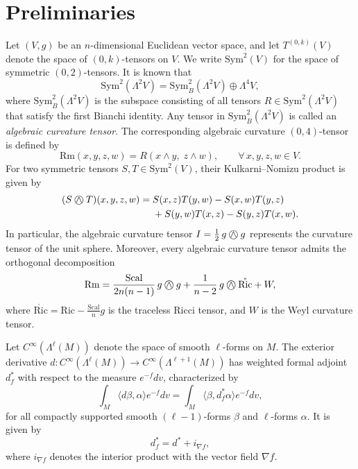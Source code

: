 \documentclass[leqno,12pt]{article} %
\theoremstyle{plain} %
\theoremstyle{definition} %
\numberwithin{equation}{section}
\newcommand{\KN}{\mathbin{\bigcirc\mspace{-15mu}\wedge\mspace{3mu}}}
\begin{document}
\section{Preliminaries}\label{sec2}
Let $(V,g)$ be an $n$-dimensional Euclidean vector space, and let
$T^{(0,k)}(V)$ denote the space of $(0,k)$-tensors on $V$. We write
$\mathrm{Sym}^2(V)$ for the space of symmetric $(0,2)$-tensors. It is known that
\[
\mathrm{Sym}^2(\Lambda^2V)
=
\mathrm{Sym}_B^2(\Lambda^2V)
\oplus
\Lambda^4V,
\]
where $\mathrm{Sym}_B^2(\Lambda^2V)$ is the subspace consisting of all tensors
$R\in\mathrm{Sym}^2(\Lambda^2V)$ that satisfy the first Bianchi identity.
Any tensor in $\mathrm{Sym}_B^2(\Lambda^2V)$ is called an
\emph{algebraic curvature tensor}.
The corresponding algebraic curvature $(0,4)$-tensor is defined by
\[
\mathrm{Rm}(x,y,z,w)
=
R(x\wedge y,\; z\wedge w),
\qquad
\forall\, x,y,z,w\in V.
\]
For two symmetric tensors $S,T\in\mathrm{Sym}^2(V)$, their
Kulkarni--Nomizu product is given by
\[
\begin{aligned}
(S\KN T)(x,y,z,w)
={}&
S(x,z)T(y,w)-S(x,w)T(y,z) \\
&
+S(y,w)T(x,z)-S(y,z)T(x,w).
\end{aligned}
\]
In particular, the algebraic curvature tensor $I=\frac12\,g\KN g$
represents the curvature tensor of the unit sphere.
Moreover, every algebraic curvature tensor admits the orthogonal decomposition
\[
\mathrm{Rm} = \frac{\mathrm{Scal}}{2n(n-1)}\,g\KN g +
\frac{1}{n-2}\,g\KN\mathring{\mathrm{Ric}} + W,
\]
where
$\mathring{\mathrm{Ric}} =\mathrm{Ric} - \frac{\mathrm{Scal}}{n}g$
is the traceless Ricci tensor, and $W$ is the Weyl curvature tensor.



Let $C^\infty(\Lambda^\ell(M))$ denote the
space of smooth $\ell$-forms on $M$. The exterior derivative
$d:C^\infty(\Lambda^\ell(M))
\longrightarrow
C^\infty(\Lambda^{\ell+1}(M))$
has weighted formal adjoint $d_f^*$ with respect to the measure
$e^{-f}dv$, characterized by
\[
\int_M \langle d\beta,\alpha\rangle e^{-f}dv
=
\int_M \langle \beta,d_f^*\alpha\rangle e^{-f}dv,
\]
for all compactly supported smooth $(\ell-1)$-forms $\beta$ and
$\ell$-forms $\alpha$. It is given by
\[
d_f^*=d^*+i_{\nabla f},
\]
where $i_{\nabla f}$ denotes the interior product with the vector field
$\nabla f$.
\end{document}
